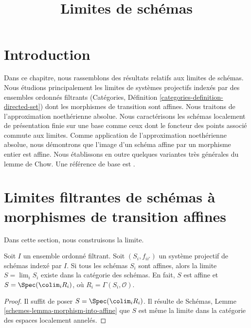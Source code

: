 

%


\title{Limites de schémas}


\maketitle

\label{section-phantom}

\tableofcontents

\section{Introduction}
\label{section-introduction}

\noindent
Dans ce chapitre, nous rassemblons des résultats relatifs aux limites de
schémas. Nous étudions principalement les limites de systèmes projectifs
indexés par des ensembles ordonnés filtrants
(Catégories, Définition \ref{categories-definition-directed-set})
dont les morphismes de transition sont affines. Nous traitons de
l'approximation noethérienne absolue. Nous caractérisons les schémas
localement de présentation finie sur une base comme ceux dont le foncteur
des points associé commute aux limites. Comme application de
l'approximation noethérienne absolue, nous démontrons que l'image d'un
schéma affine par un morphisme entier est affine. Nous établissons en outre
quelques variantes très générales du lemme de Chow. Une référence de base
est \cite{EGA}.




\section{Limites filtrantes de schémas à morphismes de transition affines}
\label{section-limits}

\noindent
Dans cette section, nous construisons la limite.

\begin{lemma}
\label{lemma-directed-inverse-system-affine-schemes-has-limit}
Soit $I$ un ensemble ordonné filtrant. Soit $(S_i, f_{ii'})$ un système
projectif de schémas indexé par $I$. Si tous les schémas $S_i$ sont
affines, alors la limite $S = \lim_i S_i$ existe dans la catégorie des
schémas. En fait, $S$ est affine et $S = \Spec(\colim_i R_i)$, où
$R_i = \Gamma(S_i, \mathcal{O})$.
\end{lemma}

\begin{proof}
Il suffit de poser $S = \Spec(\colim_i R_i)$.
Il résulte de Schémas, Lemme \ref{schemes-lemma-morphism-into-affine}
que $S$ est même la limite dans la catégorie des espaces localement
annelés.
\end{proof}

